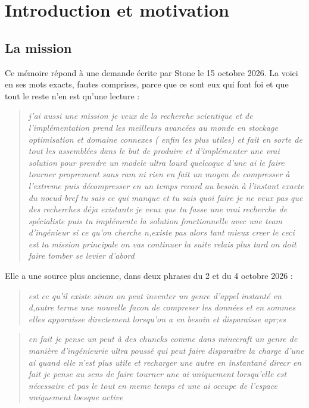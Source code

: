 \chapter{Introduction et motivation}\label{ch:intro}

\section{La mission}\label{sec:mission}

Ce mémoire répond à une demande écrite par Stone le 15 octobre 2026. La voici en ses mots exacts, fautes comprises, parce que ce sont eux qui font foi et que tout le reste n'en est qu'une lecture :

\begin{quote}\itshape
j'ai aussi une mission je veux de la recherche scientique et de l'implémentation prend les meilleurs avancées au monde en stockage optimisation et domaine connexes ( enfin les plus utiles) et fait en sorte de tout les assemblées dans le but de produire et d'implémenter une vrai solution pour prendre un modele ultra lourd quelcoque d'une ai le faire tourner proprement sans ram ni rien en fait un moyen de compresser à l'extreme puis décompresser en un temps record au besoin à l'instant exacte du noeud bref tu sais ce qui manque et tu sais quoi faire je ne veux pas que des recherches déja existante je veux que tu fasse une vrai recherche de spécialiste puis tu implémente la solution fonctionnelle avec une team d'ingénieur si ce qu'on cherche n,existe pas alors tant mieux creer le ceci est ta mission principale on vas continuer la suite relais plus tard on doit faire tomber se levier d'abord
\end{quote}

Elle a une source plus ancienne, dans deux phrases du 2 et du 4 octobre 2026 :

\begin{quote}\itshape
est ce qu'il existe sinon on peut inventer un genre d'appel instanté en d,autre terme une nouvelle facon de compreser les données et en sommes elles apparaisse directement lorsqu'on a en besoin et disparaisse apr;es
\end{quote}
\begin{quote}\itshape
en fait je pense un peut à des chuncks comme dans minecraft un genre de manière d'ingénieurie ultra poussé qui peut faire disparaitre la charge d'une ai quand elle n'est plus utile et recharger une autre en instantané direcr en fait je pense au sens de faire tourner une ai uniquement lorsqu'elle est nécessaire et pas le tout en meme temps et une ai occupe de l'espace uniquement loesque active
\end{quote}

